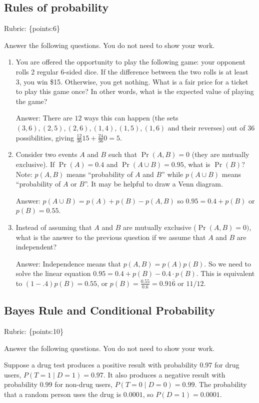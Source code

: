 \documentclass{article}
\def\ans#1{\par\gre{Answer: #1}}
\def\rubric#1{\gre{Rubric: \{#1\}}}{}
\def\blu#1{{\color{blu}#1}}
\def\gre#1{{\color{gre}#1}}
\begin{document}
	\subsection{Rules of probability}
	\rubric{points:6}
	
	\blu{Answer the following questions.} You do not need to show your work.
	
	
	\begin{enumerate}
		\item You are offered the opportunity to play the following game: your opponent rolls 2 regular 6-sided dice. If the difference between the two rolls is at least 3, you win \$15. Otherwise, you get nothing. What is a fair price for a ticket to play this game once? In other words, what is the expected value of playing the game?
		\ans{There are $12$ ways this can happen (the sets $(3,6), (2,5), (2,6), (1,4), (1,5), (1,6)$ and their reverses) out of $36$ possibilities, giving $\frac{12}{36}15 + \frac{24}{36}0 = 5$.}
		\item Consider two events $A$ and $B$ such that $\Pr(A, B)=0$ (they are mutually exclusive). If $\Pr(A) = 0.4$ and $\Pr(A \cup B) = 0.95$, what is $\Pr(B)$? Note: $p(A, B)$ means
		``probability of $A$ and $B$'' while $p(A \cup B)$ means ``probability of $A$ or $B$''. It may be helpful to draw a Venn diagram.
		\ans{$p(A \cup B) = p(A) + p(B) - p(A,B)$ so $0.95 = 0.4 + p(B)$ or $p(B) = 0.55$.}
		\item Instead of assuming that $A$ and $B$ are mutually exclusive ($\Pr(A,B) = 0)$, what is the answer to the previous question if we assume that $A$ and $B$ are independent?
		\ans{Independence means that $p(A, B) = p(A)p(B)$. So we need to solve the linear equation $0.95 = 0.4 + p(B)  - 0.4\cdot p(B)$. This is equivalent to $(1-.4)p(B) = 0.55$, or $p(B) = \frac{0.55}{0.6} = 0.91\overline{6}$ or $11/12$.}
		
		
	\end{enumerate}
	
	\subsection{Bayes Rule and Conditional Probability}
	\rubric{points:10}
	
	\blu{Answer the following questions.} You do not need to show your work.
	
	Suppose a drug test produces a positive result with probability $0.97$ for drug users, $P(T=1 \mid D=1)=0.97$. It also produces a negative result with probability $0.99$ for non-drug users, $P(T=0 \mid D=0)=0.99$. The probability that a random person uses the drug is $0.0001$, so $P(D=1)=0.0001$.
	
\end{document}
